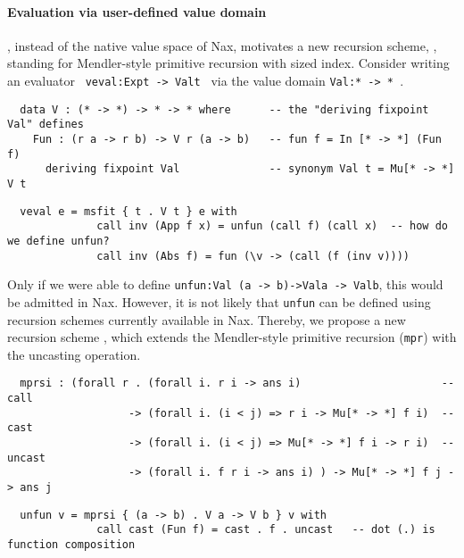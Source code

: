 \paragraph{Evaluation via user-defined value domain\!\!\!\!\!}, instead of
the native value space of Nax, motivates a new recursion scheme,
\mprsi, standing for Mendler-style primitive recursion with sized index.
Consider writing an evaluator \texttt{\,veval\;:\;Exp\;t\,->\,Val\;t\,}
via the value domain \texttt{Val\;:\;*\,->\,*\,}.\vspace*{-.5ex}
{\small
\begin{verbatim}
  data V : (* -> *) -> * -> * where      -- the "deriving fixpoint Val" defines
    Fun : (r a -> r b) -> V r (a -> b)   -- fun f = In [* -> *] (Fun f)
      deriving fixpoint Val              -- synonym Val t = Mu[* -> *] V t
\end{verbatim}\vspace*{-1.5ex}
\begin{verbatim}
  veval e = msfit { t . V t } e with
              call inv (App f x) = unfun (call f) (call x)  -- how do we define unfun?
              call inv (Abs f) = fun (\v -> (call (f (inv v))))
\end{verbatim} }
\noindent
Only if we were able to define
\texttt{unfun\;:\;Val\,(a\,->\,b)\;->\;Val\;a\,->\,Val\;b},
this would be admitted in Nax.
However, it is not likely that \texttt{unfun} can be defined using
recursion schemes currently available in Nax. Thereby, we propose
a new recursion scheme \mprsi, which extends the Mendler-style primitive recursion
(\texttt{mpr}) with the uncasting operation.\vspace*{-.5ex}
{\small
\begin{verbatim}
  mprsi : (forall r . (forall i. r i -> ans i)                      -- call
                   -> (forall i. (i < j) => r i -> Mu[* -> *] f i)  -- cast   
                   -> (forall i. (i < j) => Mu[* -> *] f i -> r i)  -- uncast 
                   -> (forall i. f r i -> ans i) ) -> Mu[* -> *] f j -> ans j
\end{verbatim}\vspace*{-1.5ex}
\begin{verbatim}
  unfun v = mprsi { (a -> b) . V a -> V b } v with
              call cast (Fun f) = cast . f . uncast   -- dot (.) is function composition
\end{verbatim} }\vspace*{-.5ex}
